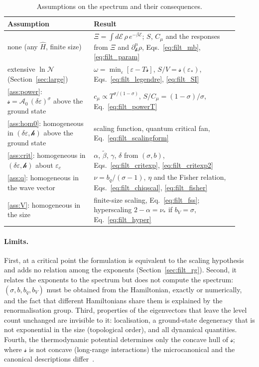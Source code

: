 \documentclass[10pt,a4paper]{article}
\theoremstyle{plain}
\newcommand{\cN}{\mathcal{N}}   %
\newcommand{\cA}{{\mathcal{A}_0}}   %
\newcommand{\hfield}{\mathscr{h}}  %
\newcommand{\enrg}{\mathcal{E}}  %
\newcommand{\lds}{\mathscr{s}}  %
\begin{document}
\begin{table}[htbp]
\centering
\small
\caption{Assumptions on the spectrum and their consequences.}
\label{tab:assumptions}
\begin{tabular}{p{0.34\linewidth}p{0.58\linewidth}}
\toprule
Assumption & Result \\
\midrule
none (any $\hat H$, finite size) &
$\Xi=\int d\enrg\,\rho\,e^{-\beta\enrg}$; $S$, $C_\mu$ and the responses from
$\Xi$ and $\partial_\hfield^{n}\rho$,
Eqs.~\eqref{eq:filt_mb}, \eqref{eq:filt_param} \\[2pt]
extensive $\ln\cN$ (Section~\ref{sec:large}) &
$\omega=\min_\varepsilon[\varepsilon-T\lds]$, $S/V=\lds(\varepsilon_*)$,
Eqs.~\eqref{eq:filt_legendre}, \eqref{eq:filt_SI} \\[2pt]
\ref{ass:power}: $\lds=\cA\,(\delta\varepsilon)^{\sigma}$ above the ground state &
$c_\mu\propto T^{\sigma/(1-\sigma)}$, $S/C_\mu=(1-\sigma)/\sigma$,
Eq.~\eqref{eq:filt_powerT} \\[2pt]
\ref{ass:hom0}: homogeneous in $(\delta\varepsilon,\hfield)$ above the ground state &
scaling function, quantum critical fan, Eq.~\eqref{eq:filt_scalingform} \\[2pt]
\ref{ass:crit}: homogeneous in $(\delta\varepsilon,\hfield)$ about $\varepsilon_c$ &
$\alpha$, $\tilde\beta$, $\gamma$, $\delta$ from $(\sigma,b)$,
Eqs.~\eqref{eq:filt_critexp}, \eqref{eq:filt_critexp2} \\[2pt]
\ref{ass:q}: homogeneous in the wave vector &
$\nu=b_q/(\sigma-1)$, $\eta$ and the Fisher relation,
Eqs.~\eqref{eq:filt_chiqscal}, \eqref{eq:filt_fisher} \\[2pt]
\ref{ass:V}: homogeneous in the size &
finite-size scaling, Eq.~\eqref{eq:filt_fss}; hyperscaling $2-\alpha=\nu_*$
if $b_V=\sigma$, Eq.~\eqref{eq:filt_hyper} \\
\bottomrule
\end{tabular}
\end{table}

\paragraph{Limits.}\label{sec:scope}
First, at a critical point the formulation is equivalent to the scaling
hypothesis and adds no relation among the exponents
(Section~\ref{sec:filt_rg}). Second, it relates the exponents to the
spectrum but does not compute the spectrum: $(\sigma,b,b_q,b_V)$ must be
obtained from the Hamiltonian, exactly or numerically, and the fact that
different Hamiltonians share them is explained by the renormalisation
group. Third, properties of the eigenvectors that leave the level count
unchanged are invisible to it: localisation, a ground-state degeneracy that
is not exponential in the size (topological order), and all dynamical
quantities. Fourth, the thermodynamic potential determines only the concave hull of
$\lds$; where $\lds$ is not concave (long-range interactions) the
microcanonical and the canonical descriptions differ~\cite{Campa2009}.
\end{document}
